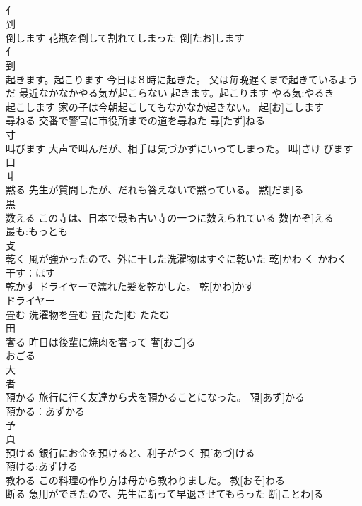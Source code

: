 \documentclass[8pt]{extreport}
\begin{document}
\begin{CJK}{UTF8}{min}
\\	亻 
\\	到 
\\	倒します	花瓶を倒して割れてしまった	倒[たお]します			
\\	亻 
\\	到 
\\	起きます。起こります	今日は８時に起きた。 父は毎晩遅くまで起きているようだ 最近なかなかやる気が起こらない	起きます。起こります			やる気:やるき
\\	起こします	家の子は今朝起こしてもなかなか起きない。	起[お]こします			
\\	尋ねる	交番で警官に市役所までの道を尋ねた	尋[たず]ねる	
\\	寸 
\\	叫びます	大声で叫んだが、相手は気づかずにいってしまった。	叫[さけ]びます	
\\	口 
\\	丩	
\\	黙る	先生が質問したが、だれも答えないで黙っている。	黙[だま]る	
\\	黒 
\\	数える	この寺は、日本で最も古い寺の一つに数えられている	数[かぞ]える			
\\	最も:もっとも
\\	攴 
\\	乾く	風が強かったので、外に干した洗濯物はすぐに乾いた	乾[かわ]く			かわく
\\	干す：ほす
\\	乾かす	ドライヤーで濡れた髪を乾かした。	乾[かわ]かす			
\\	ドライヤー
\\	畳む	洗濯物を畳む	畳[たた]む			たたむ
\\	田 
\\	奢る	昨日は後輩に焼肉を奢って	奢[おご]る	
\\	おごる
\\	大 
\\	者 
\\	預かる	旅行に行く友達から犬を預かることになった。	預[あず]かる	
\\	預かる：あずかる
\\	予 
\\	頁 
\\	預ける	銀行にお金を預けると、利子がつく	預[あづ]ける	
\\	預ける:あずける
\\	教わる	この料理の作り方は母から教わりました。	教[おそ]わる			
\\	断る	急用ができたので、先生に断って早退させてもらった	断[ことわ]る	

\end{CJK}
\end{document}

